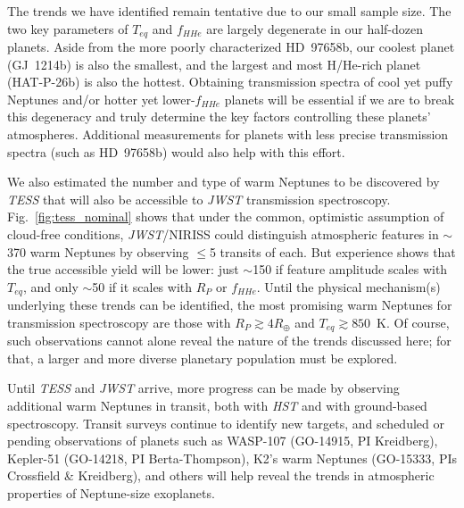 \documentclass[twocolumn]{aastex61}
\begin{document}
The trends we have identified remain tentative due to our small sample
size. The two key parameters of $T_{eq}$ and $f_{HHe}$ are largely
degenerate in our half-dozen planets. Aside from the more poorly
characterized HD~97658b, our coolest planet (GJ~1214b) is also the
smallest, and the largest and most H/He-rich planet (HAT-P-26b) is
also the hottest.  Obtaining transmission spectra of cool yet puffy
Neptunes \citep[such as
  HD~3167c;][]{vanderburg:2016b,christiansen:2017} and/or hotter yet
lower-$f_{HHe}$ planets \citep[such as
  HIP~41378b;][]{vanderburg:2016c} will be essential if we are to
break this degeneracy and truly determine the key factors controlling
these planets' atmospheres. Additional measurements for planets with
less precise transmission spectra (such as HD~97658b) would also help
with this effort.

We also estimated the number and type of warm Neptunes to be
discovered by {\em TESS} that will also be accessible to {\em JWST}
transmission spectroscopy. Fig.~\ref{fig:tess_nominal} shows that
under the common, optimistic assumption of cloud-free conditions, {\em
  JWST}/NIRISS could distinguish atmospheric features in $\sim$370
warm Neptunes by observing $\le$5 transits of each.  But experience
shows that the true accessible yield will be lower: just $\sim$150 if
feature amplitude scales with $T_{eq}$, and only $\sim$50 if it scales
with $R_P$ or $f_{HHe}$. Until the physical mechanism(s) underlying
these trends can be identified, the most promising warm Neptunes for
transmission spectroscopy are those with $R_P\gtrsim 4 R_\oplus$ and
$T_{eq}\gtrsim850$~K.  Of course, such observations cannot alone
reveal the nature of the trends discussed here; for that, a larger and
more diverse planetary population must be explored.

Until {\em TESS} and {\em JWST} arrive, more progress can be made by observing additional warm Neptunes in transit, both with {\em HST} and with ground-based spectroscopy.  Transit surveys continue to identify new targets, and scheduled or pending observations of planets such as WASP-107 (GO-14915, PI Kreidberg), Kepler-51 (GO-14218, PI Berta-Thompson), K2's warm Neptunes (GO-15333, PIs Crossfield \& Kreidberg), and others will help reveal the trends in atmospheric properties of Neptune-size exoplanets.

\end{document}
